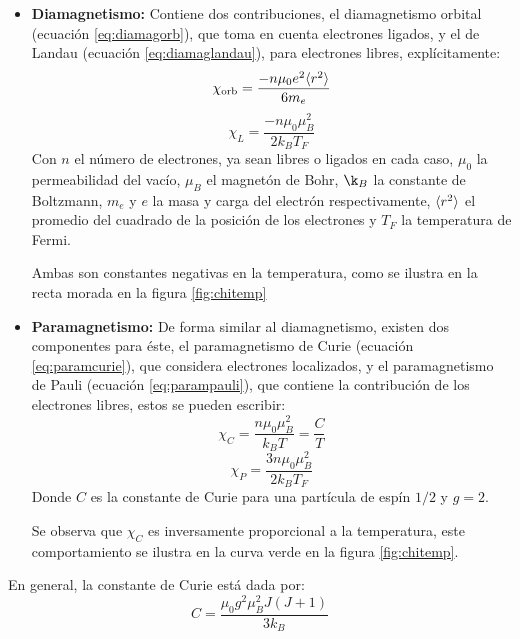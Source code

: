 \documentclass[../main.tex]{subfiles}
\begin{document}
\begin{itemize}
    \item \textbf{Diamagnetismo:} Contiene dos contribuciones, el diamagnetismo orbital (ecuación \ref{eq:diamagorb}), que toma en cuenta electrones ligados, y el de Landau (ecuación \ref{eq:diamaglandau}), para electrones libres, explícitamente:
    \begin{equation}
            \chi_{\text{orb}}=\dfrac{-n\mu_0e^2\langle r^2 \rangle}{6m_e}\\
        \label{eq:diamagorb}
    \end{equation}
    \begin{equation}
        \chi_L=\dfrac{-n\mu_0\mu_B^2}{2k_BT_F}
        \label{eq:diamaglandau}
    \end{equation}
    Con $n$ el número de electrones, ya sean libres o ligados en cada caso, $\mu_0$ la permeabilidad del vacío, $\mu_B$ el magnetón de Bohr, $\k_B$ la constante de Boltzmann, $m_e$ y $e$ la masa y carga del electrón respectivamente, $\langle r^2 \rangle$ el promedio del cuadrado de la posición de los electrones y $T_F$ la temperatura de Fermi.

    Ambas son constantes negativas en la temperatura, como se ilustra en la recta morada en la figura \ref{fig:chitemp}
    \item \textbf{Paramagnetismo:} De forma similar al diamagnetismo, existen dos componentes para éste, el paramagnetismo de Curie (ecuación \ref{eq:paramcurie}), que considera electrones localizados, y el paramagnetismo de Pauli (ecuación \ref{eq:parampauli}), que contiene la contribución de los electrones libres, estos se pueden escribir:
    \begin{equation}
        \chi_C=\dfrac{n\mu_0\mu_B^2}{k_B T}=\dfrac{C}{T}
        \label{eq:paramcurie}
    \end{equation}
    \begin{equation}
        \chi_P=\dfrac{3n\mu_0\mu_B^2}{2k_BT_F}
        \label{eq:parampauli}
    \end{equation}
    Donde $C$ es la constante de Curie para una partícula de espín $1/2$ y $g=2$.
    
    Se observa que $\chi_C$ es inversamente proporcional a la temperatura, este comportamiento se ilustra en la curva verde en la figura \ref{fig:chitemp}.
\end{itemize}
En general, la constante de Curie está dada por:
\begin{equation}
    C=\dfrac{\mu_0g^2\mu_B^2J(J+1)}{3k_B}
    \label{eq:constcurie}
\end{equation}
\end{document}
